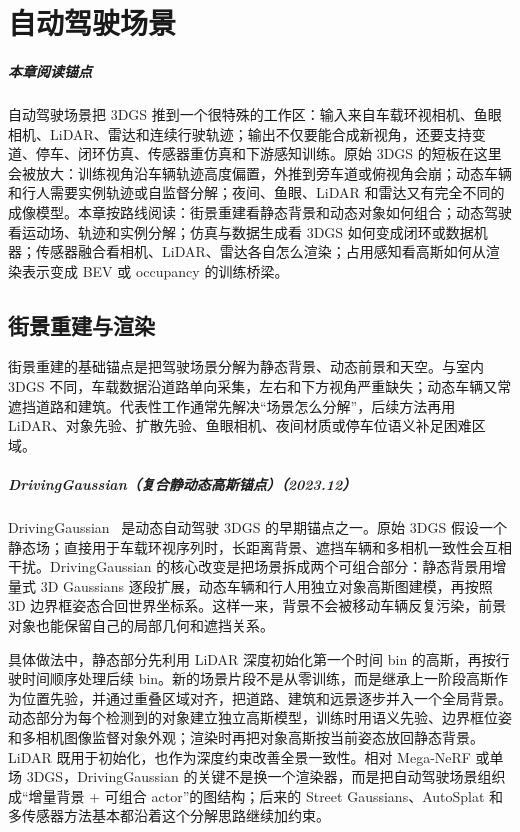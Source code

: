\chapter{自动驾驶场景}

\paragraph*{本章阅读锚点}
自动驾驶场景把 3DGS 推到一个很特殊的工作区：输入来自车载环视相机、鱼眼相机、LiDAR、雷达和连续行驶轨迹；输出不仅要能合成新视角，还要支持变道、停车、闭环仿真、传感器重仿真和下游感知训练。原始 3DGS 的短板在这里会被放大：训练视角沿车辆轨迹高度偏置，外推到旁车道或俯视角会崩；动态车辆和行人需要实例轨迹或自监督分解；夜间、鱼眼、LiDAR 和雷达又有完全不同的成像模型。本章按路线阅读：街景重建看静态背景和动态对象如何组合；动态驾驶看运动场、轨迹和实例分解；仿真与数据生成看 3DGS 如何变成闭环或数据机器；传感器融合看相机、LiDAR、雷达各自怎么渲染；占用感知看高斯如何从渲染表示变成 BEV 或 occupancy 的训练桥梁。

\section{街景重建与渲染}

街景重建的基础锚点是把驾驶场景分解为静态背景、动态前景和天空。与室内 3DGS 不同，车载数据沿道路单向采集，左右和下方视角严重缺失；动态车辆又常遮挡道路和建筑。代表性工作通常先解决“场景怎么分解”，后续方法再用 LiDAR、对象先验、扩散先验、鱼眼相机、夜间材质或停车位语义补足困难区域。



\paragraph{DrivingGaussian（复合静动态高斯锚点）（2023.12）}
DrivingGaussian~\cite{2312_07920} 是动态自动驾驶 3DGS 的早期锚点之一。原始 3DGS 假设一个静态场；直接用于车载环视序列时，长距离背景、遮挡车辆和多相机一致性会互相干扰。DrivingGaussian 的核心改变是把场景拆成两个可组合部分：静态背景用增量式 3D Gaussians 逐段扩展，动态车辆和行人用独立对象高斯图建模，再按照 3D 边界框姿态合回世界坐标系。这样一来，背景不会被移动车辆反复污染，前景对象也能保留自己的局部几何和遮挡关系。

具体做法中，静态部分先利用 LiDAR 深度初始化第一个时间 bin 的高斯，再按行驶时间顺序处理后续 bin。新的场景片段不是从零训练，而是继承上一阶段高斯作为位置先验，并通过重叠区域对齐，把道路、建筑和远景逐步并入一个全局背景。动态部分为每个检测到的对象建立独立高斯模型，训练时用语义先验、边界框位姿和多相机图像监督对象外观；渲染时再把对象高斯按当前姿态放回静态背景。LiDAR 既用于初始化，也作为深度约束改善全景一致性。相对 Mega-NeRF 或单场 3DGS，DrivingGaussian 的关键不是换一个渲染器，而是把自动驾驶场景组织成“增量背景 + 可组合 actor”的图结构；后来的 Street Gaussians、AutoSplat 和多传感器方法基本都沿着这个分解思路继续加约束。

